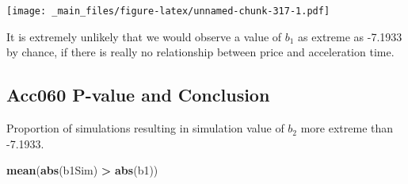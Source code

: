 \documentclass[]{book}
\newenvironment{Shaded}{\begin{snugshade}}{\end{snugshade}}
\newcommand{\KeywordTok}[1]{\textcolor[rgb]{0.13,0.29,0.53}{\textbf{#1}}}
\newcommand{\DataTypeTok}[1]{\textcolor[rgb]{0.13,0.29,0.53}{#1}}
\newcommand{\DecValTok}[1]{\textcolor[rgb]{0.00,0.00,0.81}{#1}}
\newcommand{\StringTok}[1]{\textcolor[rgb]{0.31,0.60,0.02}{#1}}
\newcommand{\OperatorTok}[1]{\textcolor[rgb]{0.81,0.36,0.00}{\textbf{#1}}}
\newcommand{\NormalTok}[1]{#1}
\begin{document}
\begin{Shaded}
\end{Shaded}

\texttt{[image: \_main\_files/figure-latex/unnamed-chunk-317-1.pdf]}

It is extremely unlikely that we would observe a value of \(b_1\) as
extreme as -7.1933 by chance, if there is really no relationship between
price and acceleration time.

\subsection{Acc060 P-value and
Conclusion}\label{acc060-p-value-and-conclusion}

Proportion of simulations resulting in simulation value of \(b_2\) more
extreme than -7.1933.

\begin{Shaded}
\begin{Highlighting}[]
\KeywordTok{mean}\NormalTok{(}\KeywordTok{abs}\NormalTok{(b1Sim) }\OperatorTok{>}\StringTok{ }\KeywordTok{abs}\NormalTok{(b1))}
\end{Highlighting}
\end{Shaded}
\end{document}
